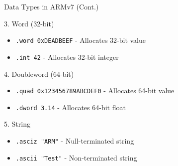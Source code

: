 \documentclass[aspectratio=169]{beamer}
\begin{document}
\begin{frame}{Data Types in ARMv7 (Cont.)}
\begin{block}{3. Word (32-bit)}
\begin{itemize}
    \item \texttt{.word 0xDEADBEEF} - Allocates 32-bit value
    \item \texttt{.int 42} - Allocates 32-bit integer
\end{itemize}
\end{block}

\begin{block}{4. Doubleword (64-bit)}
\begin{itemize}
    \item \texttt{.quad 0x123456789ABCDEF0} - Allocates 64-bit value
    \item \texttt{.dword 3.14} - Allocates 64-bit float
\end{itemize}
\end{block}

\begin{block}{5. String}
\begin{itemize}
    \item \texttt{.asciz "ARM"} - Null-terminated string
    \item \texttt{.ascii "Test"} - Non-terminated string
\end{itemize}
\end{block}
\end{frame}
\end{document}
